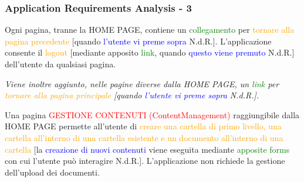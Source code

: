 \documentclass[aspectratio=169, dvipsnames]{beamer}
\begin{document}
\begin{frame}
    \frametitle{Application Requirements Analysis - 3}
    Ogni pagina, tranne la HOME PAGE, contiene un \textcolor{Green}{collegamento} per
    \textcolor{Orange}{tornare alla pagina precedente} [quando \textcolor{Blue}{l'utente vi preme sopra} N.d.R.].
    L’applicazione consente il \textcolor{Orange}{logout} [mediante apposito \textcolor{Green}{link}, quando
        \textcolor{Blue}{questo viene premuto} N.d.R.] dell’utente da qualsiasi pagina. \newline

    \textit{Viene inoltre aggiunto, nelle pagine diverse dalla HOME PAGE, un \textcolor{Green}{link} per
        \textcolor{Orange}{tornare alla pagina principale} [quando \textcolor{Blue}{l'utente vi preme sopra} N.d.R.].}
    \newline

    Una pagina \textcolor{Red}{GESTIONE CONTENUTI (ContentManagement)} raggiungibile dalla HOME PAGE permette
    all’utente di \textcolor{Orange}{creare una cartella di primo livello, una cartella all’interno di una cartella
        esistente e un documento all’interno di una cartella} [la \textcolor{Blue}{creazione di nuovi contenuti} viene
        eseguita mediante \textcolor{Green}{apposite forms} con cui l'utente può interagire N.d.R.]. L’applicazione non
    richiede la gestione dell’upload dei documenti.\footnotemark{}

\end{frame}
\end{document}
